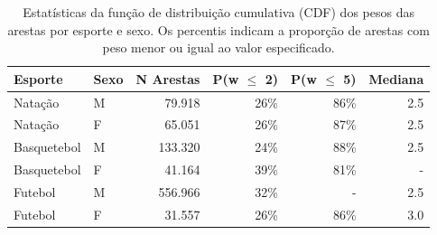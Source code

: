 \begin{table}[htbp]
\centering
\caption{Estatísticas da função de distribuição cumulativa (CDF) dos pesos das arestas por esporte e sexo. Os percentis indicam a proporção de arestas com peso menor ou igual ao valor especificado.}
\label{tab:edge_weight_statistics}
\small
\begin{tabular}{llrrrr}
\hline
\textbf{Esporte} & \textbf{Sexo} & \textbf{N Arestas} & \textbf{P(w $\leq$ 2)} & \textbf{P(w $\leq$ 5)} & \textbf{Mediana} \\
\hline
Natação & M & 79.918 & 26\% & 86\% & 2.5 \\
Natação & F & 65.051 & 26\% & 87\% & 2.5 \\
Basquetebol & M & 133.320 & 24\% & 88\% & 2.5 \\
Basquetebol & F & 41.164 & 39\% & 81\% & - \\
Futebol & M & 556.966 & 32\% & - & 2.5 \\
Futebol & F & 31.557 & 26\% & 86\% & 3.0 \\
\hline
\end{tabular}
\end{table}
